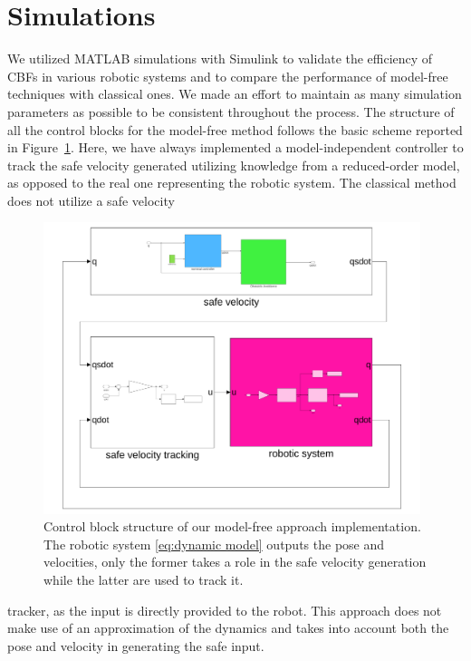 \section{Simulations}\label{sec:simulation}
We utilized MATLAB simulations with Simulink to validate the efficiency of CBFs in various robotic systems and to compare the performance of model-free techniques with classical ones. We made an effort to maintain as many simulation parameters as possible to be consistent throughout the process. The structure of all the control blocks for the model-free method follows the basic scheme reported in Figure~\ref{fig:simulink}. Here, we have always implemented a model-independent controller to track the safe velocity generated utilizing knowledge from a reduced-order model, as opposed to the real one representing the robotic system. The classical method does not utilize a safe velocity
\begin{figure}[H]
    \centering
    \includegraphics[width=11cm]{../figures/schema.pdf}
    \caption{Control block structure of our model-free approach implementation. The robotic system \eqref{eq:dynamic model} outputs the pose and velocities, only the former takes a role in the safe velocity generation while the latter are used to track it.}
    \label{fig:simulink}
\end{figure}
\noindent
tracker, as the input is directly provided to the robot. This approach does not make use of an approximation of the dynamics and takes into account both the pose and velocity in generating the safe input.

